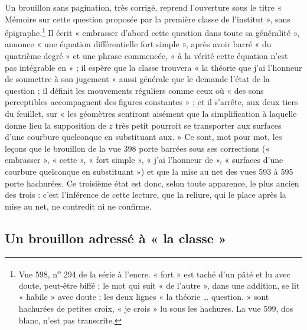 \documentclass[11pt,a4paper]{article}
\begin{document}
Un brouillon sans pagination, très corrigé, reprend l'ouverture sous le titre
« Mémoire sur cette question proposée par la première classe de l'institut », sans
épigraphe.\footnote{Vue 598, n\textsuperscript{o} 294 de la série à l'encre. « fort »
est taché d'un pâté et lu avec doute, peut-être biffé ; le mot qui suit « de l'autre »,
dans une addition, se lit « habile » avec doute ; les deux lignes « la théorie …
question. » sont hachurées de petites croix, « je crois » lu sous les hachures. La vue
599, dos blanc, n'est pas transcrite.} Il écrit « embrasser d'abord cette question dans
toute sa généralité », annonce « une équation différentielle fort simple », après avoir
barré « du quatrième degré » et une phrase commencée, « à la vérité cette équation
n'est pas intégrable en » ; il espère que la classe trouvera « la théorie que j'ai
l'honneur de soumettre à son jugement » aussi générale que le demande l'état de la
question ; il définit les mouvements réguliers comme ceux où « des sons perceptibles
accompagnent des figures constantes » ; et il s'arrête, aux deux tiers du feuillet, sur
« les géomètres sentiront aisément que la simplification à laquelle donne lieu la
supposition de $z$ très petit pourroit se transporter aux surfaces d'une courbure
quelconque en substituant aux. » Ce sont, mot pour mot, les leçons que le brouillon
de la vue 398 porte barrées sous ses corrections (« embrasser », « cette », « fort
simple », « j'ai l'honneur de », « surfaces d'une courbure quelconque en substituant »)
et que la mise au net des vues 593 à 595 porte hachurées. Ce troisième état est donc,
selon toute apparence, le plus ancien des trois : c'est l'inférence de cette lecture,
que la reliure, qui le place après la mise au net, ne contredit ni ne confirme.

\subsection*{Un brouillon adressé à « la classe »}
\end{document}
